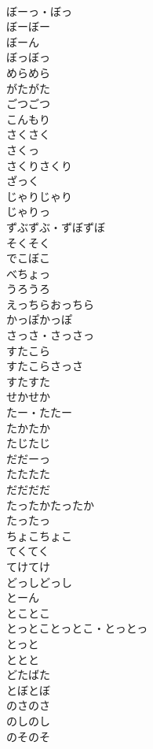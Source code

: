 \documentclass[8pt]{extreport}
\begin{document}
\begin{CJK}{UTF8}{min}
\\	ぼーっ・ぼっ	
\\	ぼーぼー	
\\	ぼーん	
\\	ぼっぼっ	
\\	めらめら	
\\	がたがた	
\\	ごつごつ	
\\	こんもり	
\\	さくさく	
\\	さくっ	
\\	さくりさくり	
\\	ざっく	
\\	じゃりじゃり	
\\	じゃりっ	
\\	ずぶずぶ・ずぼずぼ	
\\	そくそく	
\\	でこぼこ	
\\	べちょっ	
\\	うろうろ	
\\	えっちらおっちら	
\\	かっぽかっぽ	
\\	さっさ・さっさっ	
\\	すたこら	
\\	すたこらさっさ	
\\	すたすた	
\\	せかせか	
\\	たー・たたー	
\\	たかたか	
\\	たじたじ	
\\	だだーっ	
\\	たたたた	
\\	だだだだ	
\\	たったかたったか	
\\	たったっ	
\\	ちょこちょこ	
\\	てくてく	
\\	てけてけ	
\\	どっしどっし	
\\	とーん	
\\	とことこ	
\\	とっとことっとこ・とっとっ	
\\	とっと	
\\	ととと	
\\	どたばた	
\\	とぼとぼ	
\\	のさのさ	
\\	のしのし	
\\	のそのそ	

\end{CJK}
\end{document}
